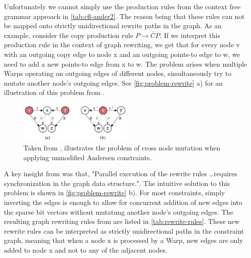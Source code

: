 Unfortunately we cannot simply use the production rules from the context free grammar approach in \autoref{tab:cfl-ander2}. The reason being that these rules can not be mapped onto strictly unidirectional rewrite paths in the graph.
As an example, consider the copy production rule $P\rightarrow \bar{C}P$. If we interpret this production rule in the context of graph rewriting, we get that for every node v with an outgoing copy edge to node x and an outgoing points-to edge to w, we need to add a new points-to edge from x to w.
The problem arises when multiple Warps operating on outgoing edges of different nodes, simultaneously try to mutate another node's outgoing edges.
See \autoref{fig:problem-rewrite} a) for an illustration of this problem from \cite{mendez2012gpu}.
\begin{figure}
    \centering
    \includegraphics[width=0.5\textwidth]{img/rewriting-concurrent.png}
    \caption[Diagram for Concurrent Graph Rewriting]{Taken from \cite{mendez2012gpu}, illustrates the problem of cross node mutation when applying unmodified Andersen constraints.}
    \label{fig:problem-rewrite}
\end{figure}
A key insight from \cite{mendez2012gpu} was that, "Parallel execution of the rewrite rules \dots requires synchronization in the graph data structure.".
The intuitive solution to this problem is shown in \autoref{fig:problem-rewrite} b). For most constraints, simply inverting the edges is enough to allow for concurrent addition of new edges into the sparse bit vectors without mutatung another node's outgoing edges.
The resulting graph rewriting rules from \cite{mendez2012gpu} are listed in \autoref{tab:rewrite-rules}. These new rewrite rules can be interpreted as strictly unidirectional paths in the constraint graph, meaning that when a node x is processed by a Warp, new edges are only added to node x and not to any of the adjacent nodes.
